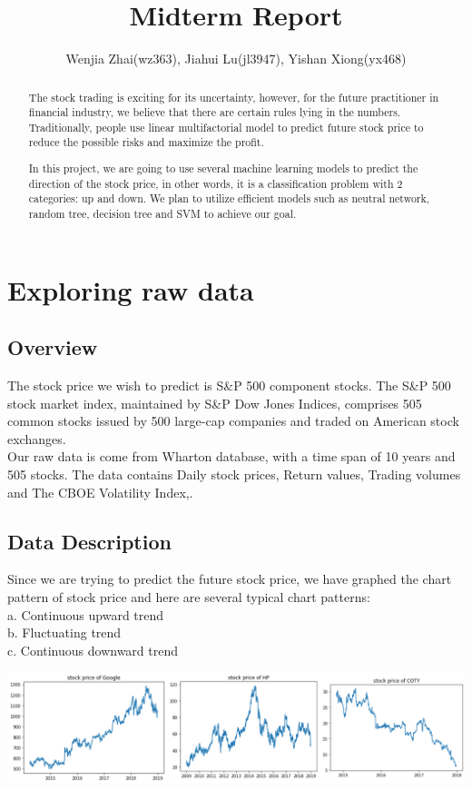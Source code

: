 \documentclass{article}
\begin{document}
	
\title{Midterm Report}
\author{Wenjia Zhai(wz363), Jiahui Lu(jl3947), Yishan Xiong(yx468)}
\date{}

\maketitle

\begin{abstract}
The stock trading is exciting for its uncertainty, however, for the future practitioner in financial industry, we believe that there are certain rules lying in the numbers. Traditionally, people use linear multifactorial model to predict future stock price to reduce the possible risks and maximize the profit. 

In this project, we are going to use several machine learning models to predict the direction of the stock price, in other words, it is a classification problem with 2 categories: up and down. We plan to utilize efficient models such as neutral network, random tree, decision tree and SVM to achieve our goal.

\end{abstract}

\section{Exploring raw data}
\subsection{Overview}
The stock price we wish to predict is S\&P 500 component stocks. The S\&P 500 stock market index, maintained by S\&P Dow Jones Indices, comprises 505 common stocks issued by 500 large-cap companies and traded on American stock exchanges. \\
Our raw data is come from Wharton database, with a time span of 10 years and 505 stocks. The data contains Daily stock prices, Return values, Trading volumes and The CBOE Volatility Index,.

\subsection{Data Description}
Since we are trying to predict the future stock price, we have graphed the chart pattern of stock price and here are several typical chart patterns: \\
a. Continuous upward trend \\
b. Fluctuating trend \\
c. Continuous downward trend \\
\begin{center}
\includegraphics[width=150mm, scale=1]{mid_1.2_4.png}
\end{center}
\end{document}
